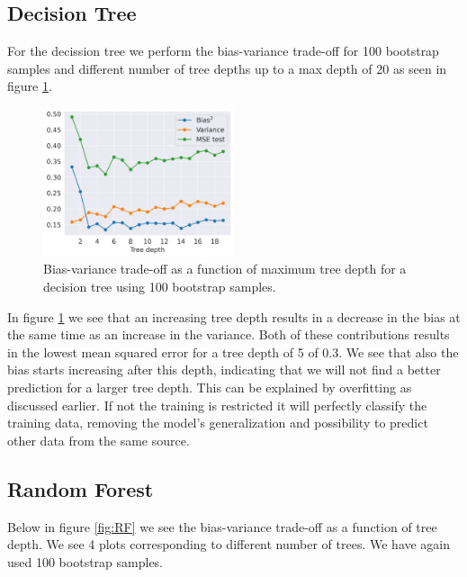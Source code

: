 \documentclass[11pt]{article}
\begin{document}
\subsection*{Decision Tree}
For the decission tree we perform the bias-variance trade-off for 100 bootstrap samples and different number of tree depths up to a max depth of 20 as seen in figure \ref{fig:DT}.
\begin{figure}[H]
    \centering
    \includegraphics[width=0.5\textwidth]{figures/tradeoff_DT.png}
    \caption{Bias-variance trade-off as a function of maximum tree depth for a decision tree using 100 bootstrap samples.}
    \label{fig:DT}
\end{figure}
In figure \ref{fig:DT} we see that an increasing tree depth results in a decrease in the bias at the same time as an increase in the variance. Both of these contributions results in the lowest mean squared error for a tree depth of 5 of 0.3. We see that also the bias starts increasing after this depth, indicating that we will not find a better prediction for a larger tree depth. This can be explained by overfitting as discussed earlier. If not the training is restricted it will perfectly classify the training data, removing the model's generalization and possibility to predict other data from the same source.
\subsection*{Random Forest}
Below in figure \ref{fig:RF} we see the bias-variance trade-off as a function of tree depth. We see 4 plots corresponding to different number of trees. We have again used 100 bootstrap samples.
\end{document}
